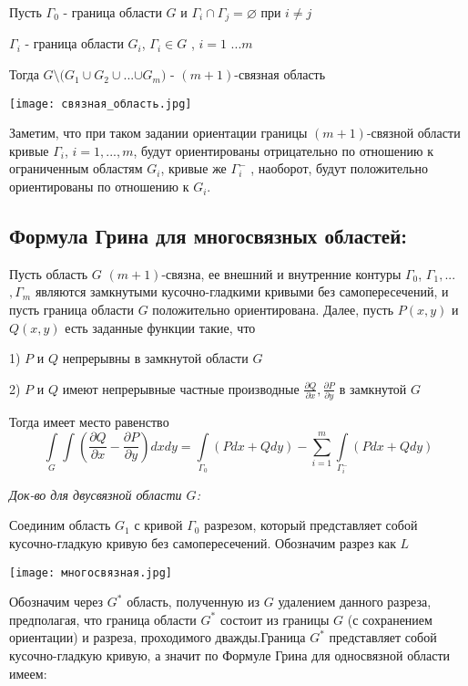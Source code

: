\documentclass{article}
\begin{document}
	Пусть $\Gamma_0$ - граница области $G$ 
	и $\Gamma_i \cap \Gamma_j = \varnothing$ при $ i \neq j$
	
	$\Gamma_i$ - граница области $G_i$, $\Gamma_i \in G$ ,  $i = 1$ ...$ m$
	
	Тогда $G \setminus (G_1 \cup G_2 \cup$...$\cup G_m)$ - $(m+1)$-связная область
	
\texttt{[image: связная\_область.jpg]}

Заметим, что при таком задании ориентации границы $(m + 1)$-связной
области кривые $\Gamma_i$, $i = 1,...,m$, будут ориентированы отрицательно по
отношению к ограниченным областям $G_i$, кривые же $\Gamma_i^-$ , наоборот, будут
положительно ориентированы по отношению к $G_i$.

\subsection*{Формула Грина для многосвязных областей:}
	Пусть область $G$ $(m + 1)$-связна, ее внешний и внутренние контуры $\Gamma_0$, $\Gamma_1,$...$, \Gamma_m$ являются замкнутыми кусочно-гладкими
кривыми без самопересечений, и пусть граница области $G$ положительно ориентирована. Далее, пусть $P(x, y)$ и $Q(x, y)$ есть заданные функции
такие, что

1)  $P$ и $Q$ непрерывны в замкнутой области $G$


2) $P$ и $Q$ имеют непрерывные частные производные $\frac{\partial Q}{\partial x},\frac{\partial P}{\partial y} $ в замкнутой $G$

Тогда имеет место равенство
\begin{equation}\label{eq3}
\int\limits_G \int (\frac{\partial Q}{\partial x} 
-
\frac{\partial P}{\partial y}) dxdy 
=
\int\limits_{\Gamma_0} (Pdx + Qdy)
-
\sum_{i = 1}^m \int\limits_{\Gamma_i^-} (Pdx + Qdy)
\end{equation}

\textit{Док-во для двусвязной области $G$:}


Соединим область $G_1$ с кривой $\Gamma_0$ разрезом, который представляет собой кусочно-гладкую кривую без самопересечений. Обозначим разрез как $L$

\texttt{[image: многосвязная.jpg]}

Обозначим через $G^*$ область, полученную из $G$ удалением данного разреза, предполагая, что граница области $G^*$ состоит из границы $G$ (с сохранением ориентации) и разреза, проходимого дважды.Граница $G^*$ представляет собой кусочно-гладкую кривую, а значит по Формуле Грина для односвязной области имеем:
\end{document}
